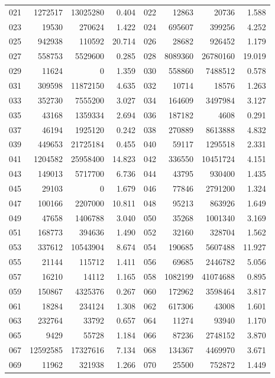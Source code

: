 \begin{longtable}{lrrr@{\hspace{16bp}}lrrr}
021 & 1272517 & 13025280 & 0.404 & 022 & 12863 & 20736 & 1.588\\
023 & 19530 & 270624 & 1.422 & 024 & 695607 & 399256 & 4.252\\
025 & 942938 & 110592 & 20.714 & 026 & 28682 & 926452 & 1.179\\
027 & 558753 & 5529600 & 0.285 & 028 & 8089360 & 26780160 & 19.019\\
029 & 11624 & 0 & 1.359 & 030 & 558860 & 7488512 & 0.578\\
031 & 309598 & 11872150 & 4.635 & 032 & 10714 & 18576 & 1.263\\
033 & 352730 & 7555200 & 3.027 & 034 & 164609 & 3497984 & 3.127\\
035 & 43168 & 1359334 & 2.694 & 036 & 187182 & 4608 & 0.291\\
037 & 46194 & 1925120 & 0.242 & 038 & 270889 & 8613888 & 4.832\\
039 & 449653 & 21725184 & 0.455 & 040 & 59117 & 1295518 & 2.331\\
041 & 1204582 & 25958400 & 14.823 & 042 & 336550 & 10451724 & 4.151\\
043 & 149013 & 5717700 & 6.736 & 044 & 43795 & 930400 & 1.435\\
045 & 29103 & 0 & 1.679 & 046 & 77846 & 2791200 & 1.324\\
047 & 100166 & 2207000 & 10.811 & 048 & 95213 & 863926 & 1.649\\
049 & 47658 & 1406788 & 3.040 & 050 & 35268 & 1001340 & 3.169\\
051 & 168773 & 394636 & 1.490 & 052 & 32160 & 328704 & 1.562\\
053 & 337612 & 10543904 & 8.674 & 054 & 190685 & 5607488 & 11.927\\
055 & 21144 & 115712 & 1.411 & 056 & 69685 & 2446782 & 5.056\\
057 & 16210 & 14112 & 1.165 & 058 & 1082199 & 41074688 & 0.895\\
059 & 150867 & 4325376 & 0.267 & 060 & 172962 & 3598464 & 3.817\\
061 & 18284 & 234124 & 1.308 & 062 & 617306 & 43008 & 1.601\\
063 & 232764 & 33792 & 0.657 & 064 & 11274 & 93940 & 1.170\\
065 & 9429 & 55728 & 1.184 & 066 & 87236 & 2748152 & 3.870\\
067 & 12592585 & 17327616 & 7.134 & 068 & 134367 & 4469970 & 3.671\\
069 & 11962 & 321938 & 1.266 & 070 & 25500 & 752872 & 1.449\\

\end{longtable}
